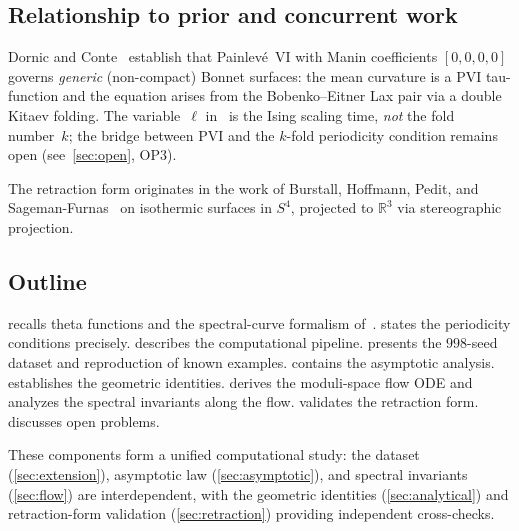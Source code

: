 \documentclass[11pt,a4paper]{article}
\theoremstyle{plain}
\theoremstyle{definition}
\theoremstyle{remark}
\newcommand{\RR}{\mathbb{R}}
\begin{document}
\subsection{Relationship to prior and concurrent work}
Dornic and Conte~\cite{DC26} establish that Painlev\'e~VI
with Manin coefficients $[0,0,0,0]$ governs \emph{generic}
(non-compact) Bonnet surfaces: the mean curvature is a PVI
tau-function and the equation arises from the Bobenko--Eitner
Lax pair via a double Kitaev folding.
The variable~$\ell$ in~\cite{DC26} is the Ising scaling time,
\emph{not} the fold number~$k$; the bridge between PVI and
the $k$-fold periodicity condition remains open
(see~\cref{sec:open}, OP3).

The retraction form originates in the work of Burstall, Hoffmann,
Pedit, and Sageman-Furnas~\cite{BCHR25} on isothermic
surfaces in $S^4$, projected to $\RR^3$ via stereographic projection.

\subsection{Outline}
 recalls theta functions and the spectral-curve
formalism of~\cite{BHS-comp}.   states the
periodicity conditions precisely.   describes
the computational pipeline.   presents the
$998$-seed dataset and reproduction of known examples.
 contains the asymptotic analysis.
 establishes the geometric identities.
 derives the moduli-space flow ODE and analyzes
the spectral invariants along the flow.
 validates the retraction form.
 discusses open problems.

These components form a unified computational study: the dataset
(\cref{sec:extension}), asymptotic law (\cref{sec:asymptotic}), and
spectral invariants (\cref{sec:flow}) are interdependent, with the
geometric identities (\cref{sec:analytical}) and retraction-form
validation (\cref{sec:retraction}) providing independent
cross-checks.

\end{document}
